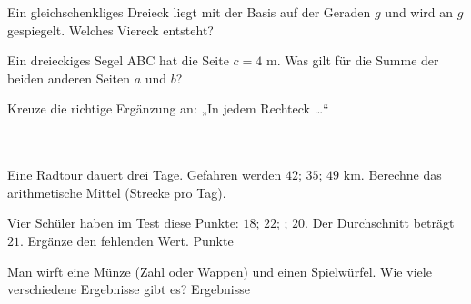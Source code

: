 \documentclass[11pt]{article}
\begin{document}
\begin{aufgabe}{Ein gleichschenkliges Dreieck liegt mit der Basis auf der Geraden $g$ und wird an $g$ gespiegelt. Welches Viereck entsteht?}
\end{aufgabe}

\begin{aufgabe}{Ein dreieckiges Segel ABC hat die Seite $c = 4$ m. Was gilt für die Summe der beiden anderen Seiten $a$ und $b$? \\   }
\end{aufgabe}

\begin{aufgabe}{Kreuze die richtige Ergänzung an: „In jedem Rechteck …“\\ \\ \\ }
\end{aufgabe}

\begin{aufgabe}{Eine Radtour dauert drei Tage. Gefahren werden $42$; $35$; $49$ km. Berechne das arithmetische Mittel (Strecke pro Tag). \leerfeld[km]}
\end{aufgabe}

\begin{aufgabe}{Vier Schüler haben im Test diese Punkte: $18$; $22$; \underline{\hspace{1cm}}; $20$. Der Durchschnitt beträgt $21$. Ergänze den fehlenden Wert. \leerfeld Punkte}
\end{aufgabe}

\begin{aufgabe}{Man wirft eine Münze (Zahl oder Wappen) und einen Spielwürfel. Wie viele verschiedene Ergebnisse gibt es? \leerfeld Ergebnisse}
\end{aufgabe}
\end{document}
